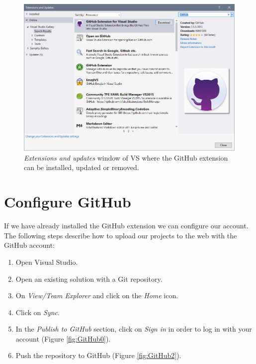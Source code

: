 \begin{figure}[h]
	\centering
	\includegraphics[width=\textwidth]{Figures/GH-1.png}
	\caption{\textit{Extensions and updates} window of VS where the GitHub extension can be installed, updated or removed.}
	\label{fig:GitHubTest0}
\end{figure}


    \section{Configure GitHub}

If we have already installed the GitHub extension we can configure our account. The following steps describe how to upload our projects to the web with the GitHub account:

\begin{enumerate}
	\item Open Visual Studio.
	\item Open an existing solution with a Git repository.
	\item On \textit{View/Team Explorer} and click on the \textit{Home} icon.
	\item Click on \textit{Sync}.
	\item In the \textit{Publish to GitHub} section, click on \textit{Sign in} in order to log in with your account (Figure \ref{fig:GitHub0}).
	\item Push the repository to GitHub (Figure \ref{fig:GitHub2}).
\end{enumerate}

